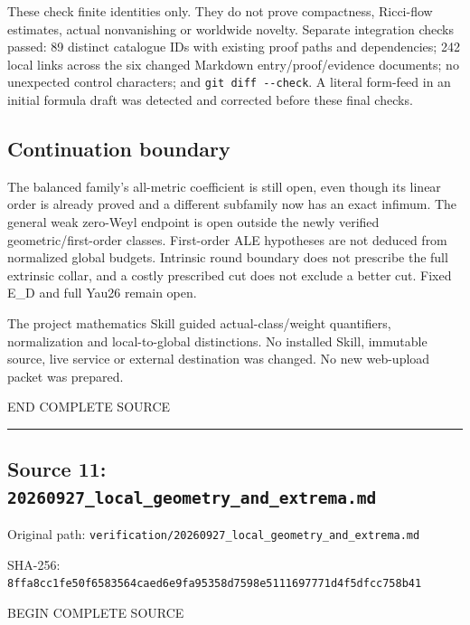\documentclass[
  10pt,
]{article}
\begin{document}
These check finite identities only. They do not prove compactness,
Ricci-flow estimates, actual nonvanishing or worldwide novelty. Separate
integration checks passed: 89 distinct catalogue IDs with existing proof
paths and dependencies; 242 local links across the six changed Markdown
entry/proof/evidence documents; no unexpected control characters; and
\texttt{git\ diff\ -\/-check}. A literal form-feed in an initial formula
draft was detected and corrected before these final checks.

\hypertarget{continuation-boundary-1}{%
\subsection{Continuation boundary}\label{continuation-boundary-1}}

The balanced family's all-metric coefficient is still open, even though
its linear order is already proved and a different subfamily now has an
exact infimum. The general weak zero-Weyl endpoint is open outside the
newly verified geometric/first-order classes. First-order ALE hypotheses
are not deduced from normalized global budgets. Intrinsic round boundary
does not prescribe the full extrinsic collar, and a costly prescribed
cut does not exclude a better cut. Fixed E\_D and full Yau26 remain
open.

The project mathematics Skill guided actual-class/weight quantifiers,
normalization and local-to-global distinctions. No installed Skill,
immutable source, live service or external destination was changed. No
new web-upload packet was prepared.

END COMPLETE SOURCE

\begin{center}\rule{0.5\linewidth}{0.5pt}\end{center}

\hypertarget{source-11-20260927_local_geometry_and_extrema.md}{%
\subsection{Source 11:
\nolinkurl{20260927_local_geometry_and_extrema.md}}\label{source-11-20260927_local_geometry_and_extrema.md}}

Original path:
\nolinkurl{verification/20260927_local_geometry_and_extrema.md}

SHA-256:
\nolinkurl{8ffa8cc1fe50f6583564caed6e9fa95358d7598e5111697771d4f5dfcc758b41}

BEGIN COMPLETE SOURCE
\end{document}
